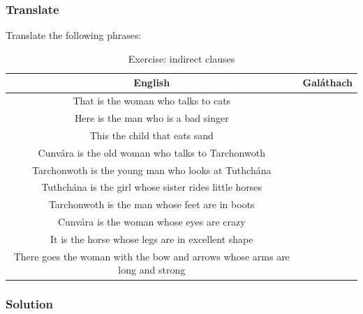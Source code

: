 \subsubsection{Translate}

Translate the following phrases:

\begin{table}[H]
\centering
\begin{tabular}{|c|M{5.0cm}|}
  \toprule
  \textbf{English} & \textbf{Gal\'{a}thach}\\
  \toprule
  That is the woman who talks to cats & \\
  \midrule
  Here is the man who is a bad singer & \\
  \midrule
  This the child that eats sand & \\
  \midrule
  Cunv\'{a}ra is the old woman who talks to Tarchonwoth & \\
  \midrule
  Tarchonwoth is the young man who looks at Tuthch\'{a}na & \\
  \midrule
  Tuthch\'{a}na is the girl whose sister rides little horses & \\
  \midrule
  Tarchonwoth is the man whose feet are in boots & \\
  \midrule
  Cunv\'{a}ra is the woman whose eyes are crazy & \\
  \midrule
  It is the horse whose legs are in excellent shape & \\
  \midrule
  There goes the woman with the bow and arrows whose arms are long and strong & \\
  \bottomrule
\end{tabular}
\label{exercise_indirect_clauses}
\caption{Exercise: indirect clauses}
\end{table}

\newpage
\subsubsection{Solution}

